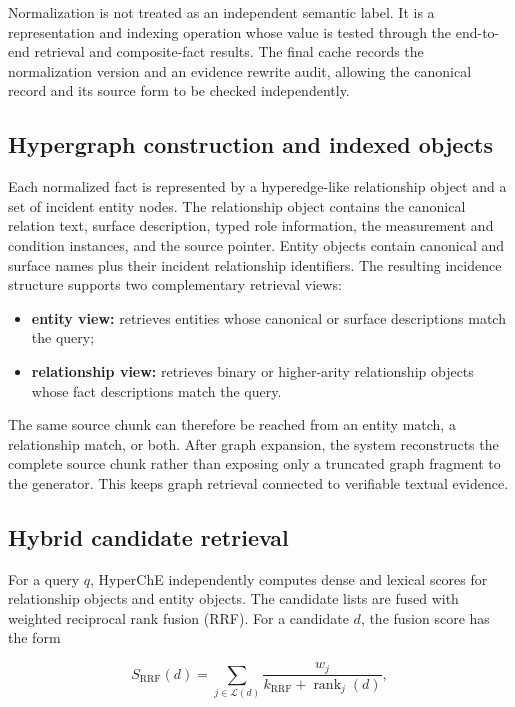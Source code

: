 Normalization is not treated as an independent semantic label. It is a representation and indexing operation whose value is tested through the end-to-end retrieval and composite-fact results. The final cache records the normalization version and an evidence rewrite audit, allowing the canonical record and its source form to be checked independently.

\subsection{Hypergraph construction and indexed objects}

Each normalized fact is represented by a hyperedge-like relationship object and a set of incident entity nodes. The relationship object contains the canonical relation text, surface description, typed role information, the measurement and condition instances, and the source pointer. Entity objects contain canonical and surface names plus their incident relationship identifiers. The resulting incidence structure supports two complementary retrieval views:

\begin{itemize}
\item \textbf{entity view:} retrieves entities whose canonical or surface descriptions match the query;
\item \textbf{relationship view:} retrieves binary or higher-arity relationship objects whose fact descriptions match the query.
\end{itemize}

The same source chunk can therefore be reached from an entity match, a relationship match, or both. After graph expansion, the system reconstructs the complete source chunk rather than exposing only a truncated graph fragment to the generator. This keeps graph retrieval connected to verifiable textual evidence.

\subsection{Hybrid candidate retrieval}

For a query $q$, HyperChE independently computes dense and lexical scores for relationship objects and entity objects. The candidate lists are fused with weighted reciprocal rank fusion (RRF). For a candidate $d$, the fusion score has the form

\[
S_{\mathrm{RRF}}(d)=
\sum_{j\in\mathcal{L}(d)}
\frac{w_j}{k_{\mathrm{RRF}}+\operatorname{rank}_j(d)},
\]

